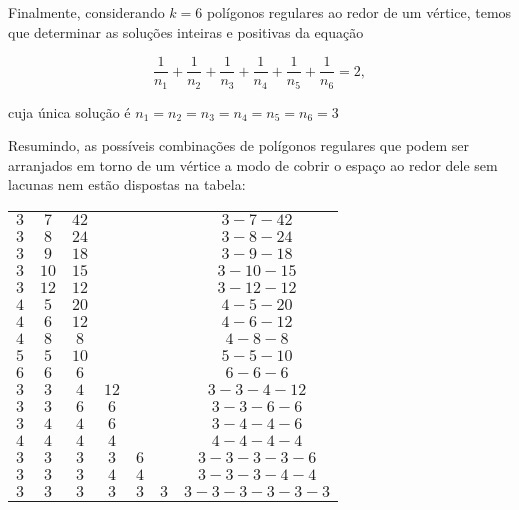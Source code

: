 Finalmente, considerando $k=6$ polígonos regulares ao redor de um vértice, temos que determinar as soluções inteiras e positivas da equação

\begin{equation*}
\frac{1}{n_1}+\frac{1}{n_2}+\frac{1}{n_3}+\frac{1}{n_4}+\frac{1}{n_5}+\frac{1}{n_6}=2,
\end{equation*}

cuja única solução é $n_1=n_2=n_3=n_4=n_5=n_6=3$

Resumindo, as possíveis combinações de polígonos regulares que podem ser arranjados em torno de um vértice a modo de cobrir o espaço ao redor dele sem lacunas nem estão dispostas na tabela:

\setlength\tabcolsep{5mm}
\begin{longtabu} to \textwidth{|c|c|c|c|c|c|c|}
\hline\endfirsthead
{} &  &  & &  &  &  \\
\hline
$3$ & $7$ & $42$ & & & & $3-7-42$ \\
\hline
$3$ & $8$ & $24$ & & & & $3-8-24$ \\
\hline
$3$ & $9$ & $18$ & & & & $3-9-18$ \\
\hline
$3$ & $10$ & $15$ & & & & $ 3-10-15$ \\
\hline
$3$ & $12$ & $12$ & & & & $3-12-12$ \\
\hline
$4$ & $5$ & $20$ & & & & $4-5-20$ \\
\hline
$4$ & $6$ & $12$ & & & & $4-6-12$ \\
\hline
$4$ & $8$ & $8$ & & & & $4-8-8$ \\
\hline
$5$ & $5$ & $10$ & & & & $5-5-10$ \\
\hline
$6$ & $6$ & $6$ & & & & $6-6-6$ \\
\hline
$3$ & $3$ & $4$ & $12$ & & & $3-3-4-12$ \\
\hline
$3$ & $3$ & $6$ & $6$ & & & $3-3-6-6$ \\
\hline
$3$ & $4$ & $4$ & $6$ & & & $3-4-4-6$ \\
\hline
$4$ & $4$ & $4$ & $4$ & & & $4-4-4-4$ \\
\hline
$3$ & $3$ & $3$ & $3$ & $6$ & & $3-3-3-3-6$ \\
\hline
$3$ & $3$ & $3$ & $4$ & $4$ & & $3-3-3-4-4$ \\
\hline
$3$ & $3$ & $3$ & $3$ & $3$ & $3$ & $3-3-3-3-3-3$ \\
\hline
\end{longtabu}

